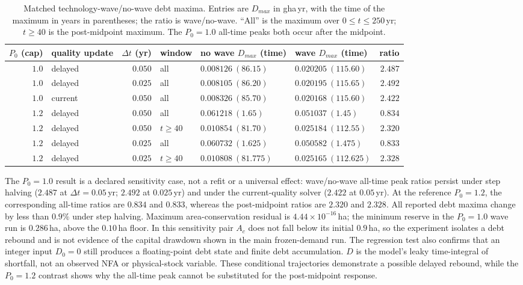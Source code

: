 \begin{table}[htbp]
\centering\small
\caption{Matched technology-wave/no-wave debt maxima. Entries are $D_{max}$ in gha\,yr, with the time of the maximum in years in parentheses; the ratio is wave/no-wave. ``All'' is the maximum over $0\le t\le250$\,yr; $t\ge40$ is the post-midpoint maximum. The $P_0=1.0$ all-time peaks both occur after the midpoint.}
\label{tab:si_wave_debt}
\begin{tabularx}{\textwidth}{r l r l >{\centering\arraybackslash}X >{\centering\arraybackslash}X r}
\toprule
$P_0$ (cap) & quality update & $\Delta t$ (yr) & window & no wave $D_{max}$ (time) & wave $D_{max}$ (time) & ratio \\
\midrule
$1.0$ & delayed & $0.050$ & all & $0.008126\ (86.15)$ & $0.020205\ (115.60)$ & $2.487$ \\
$1.0$ & delayed & $0.025$ & all & $0.008105\ (86.20)$ & $0.020195\ (115.65)$ & $2.492$ \\
$1.0$ & current & $0.050$ & all & $0.008326\ (85.70)$ & $0.020168\ (115.60)$ & $2.422$ \\
$1.2$ & delayed & $0.050$ & all & $0.061218\ (1.65)$ & $0.051037\ (1.45)$ & $0.834$ \\
$1.2$ & delayed & $0.050$ & $t\ge40$ & $0.010854\ (81.70)$ & $0.025184\ (112.55)$ & $2.320$ \\
$1.2$ & delayed & $0.025$ & all & $0.060732\ (1.625)$ & $0.050582\ (1.475)$ & $0.833$ \\
$1.2$ & delayed & $0.025$ & $t\ge40$ & $0.010808\ (81.775)$ & $0.025165\ (112.625)$ & $2.328$ \\
\bottomrule
\end{tabularx}
\end{table}

The $P_0=1.0$ result is a declared sensitivity case, not a refit or a universal effect: wave/no-wave all-time peak ratios persist under step halving ($2.487$ at $\Delta t=0.05$\,yr; $2.492$ at $0.025$\,yr) and under the current-quality solver ($2.422$ at $0.05$\,yr). At the reference $P_0=1.2$, the corresponding all-time ratios are $0.834$ and $0.833$, whereas the post-midpoint ratios are $2.320$ and $2.328$. All reported debt maxima change by less than $0.9\%$ under step halving. Maximum area-conservation residual is $4.44\times10^{-16}$\,ha; the minimum reserve in the $P_0=1.0$ wave run is $0.286$\,ha, above the $0.10$\,ha floor. In this sensitivity pair $A_c$ does not fall below its initial $0.9$\,ha, so the experiment isolates a debt rebound and is not evidence of the capital drawdown shown in the main frozen-demand run. The regression test also confirms that an integer input $D_0=0$ still produces a floating-point debt state and finite debt accumulation. $D$ is the model's leaky time-integral of shortfall, not an observed NFA or physical-stock variable. These conditional trajectories demonstrate a possible delayed rebound, while the $P_0=1.2$ contrast shows why the all-time peak cannot be substituted for the post-midpoint response.

